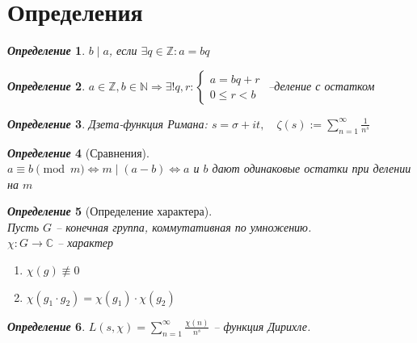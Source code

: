 \documentclass[a4paper,12pt]{article}
\newtheorem{deff2}{\textit{Определение}}
\newcommand{\ee}{\equiv}
\newcommand{\q}{\quad}
\newcommand{\bb}[1]{\mathbb{#1}}
\newcommand{\SL}{\sum\limits}
\begin{document}
\newpage

\section{Определения}

\begin{formbox}{}
\begin{deff2} $b\mid a$, если $\exists q\in \mathbb{Z}: a=bq$
\end{deff2}
\end{formbox}
\begin{formbox}{}
\begin{deff2} $a\in \bb{Z}, b\in\bb{N}\Rightarrow \exists ! q,r: \begin{cases} a = bq+r\\0 \le r < b\end{cases} $ --деление с остатком
\end{deff2}
\end{formbox}
\begin{formbox}{}
\begin{deff2}
Дзета-функция Римана: $s = \sigma + it, \q\zeta (s) := \SL_{n=1}^\infty \frac{1}{n^s}$
\end{deff2}
\end{formbox}
\begin{formbox}{}
\begin{deff2}[Сравнения]\q\\
$a \ee b \pmod{m}\iff m\mid (a-b) \iff a$ и $b$ дают одинаковые остатки при делении на $m$
\end{deff2}
\end{formbox}
\begin{formbox}{}
\begin{deff2} [Определение характера]\q\\
Пусть $G$ -- конечная группа, коммутативная по умножению.\\
$\chi:G\to\bb{C}$ -- характер
\begin{enumerate}
\item $\chi(g) \not\ee0 $
\item $\chi(g_1 \cdot g_2) = \chi(g_1)\cdot \chi(g_2)  $
\end{enumerate}
\end{deff2}
\end{formbox}
\begin{formbox}{}
\begin{deff2}
$L(s,\chi) = \SL_{n=1}^\infty \frac{\chi(n)}{n^s}$ -- функция Дирихле.
\end{deff2}
\end{formbox}
\end{document}

